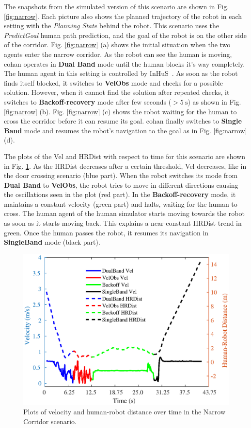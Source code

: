 The snapshots from the simulated version of this scenario are shown in Fig. \ref{fig:narrow}. Each picture also shows the planned trajectory of the robot in each setting with the \textit{Planning State} behind the robot. This scenario uses the \textit{PredictGoal} human path prediction, and the goal of the robot is on the other side of the corridor. Fig. \ref{fig:narrow} (a) shows the initial situation when the two agents enter the narrow corridor. As the robot can see the human is moving, \acrshort{cohan} operates in \textbf{Dual Band} mode until the human blocks it's way completely. The human agent in this setting is controlled by InHuS~\cite{favier2021intelligent}. As soon as the robot finds itself blocked, it switches to \textbf{VelObs} mode and checks for a possible solution. However, when it cannot find the solution after repeated checks, it switches to \textbf{Backoff-recovery} mode after few seconds ($> \SI{5}{\second}$) as shown in Fig. \ref{fig:narrow} (b). Fig. \ref{fig:narrow} (c) shows the robot waiting for the human to cross the corridor before it can resume its goal. \acrshort{cohan} finally switches to \textbf{Single Band} mode and resumes the robot's navigation to the goal as in Fig. \ref{fig:narrow} (d).

The plots of the Vel and HRDist with respect to time for this scenario are shown in Fig. \ref{fig:narrow_plot}. As the HRDist decreases after a certain threshold, Vel decreases, like in the door crossing scenario (blue part). When the robot switches its mode from \textbf{Dual Band} to \textbf{VelObs}, the robot tries to move in different directions causing the oscillations seen in the plot (red part). In the \textbf{Backoff-recovery} mode, it maintains a constant velocity (green part) and halts, waiting for the human to cross. The human agent of the human simulator starts moving towards the robot as soon as it starts moving back. This explains a near-constant HRDist trend in green. Once the human passes the robot, it resumes its navigation in \textbf{SingleBand} mode (black part).
\begin{figure}[h!]
    \centering
    \includegraphics[width=0.8\linewidth]{images/chapter4/nr_cor.eps}
    \caption{Plots of velocity and human-robot distance over time in the Narrow Corridor scenario.}
    \label{fig:narrow_plot}
    \vspace{-0.3cm}
\end{figure}

